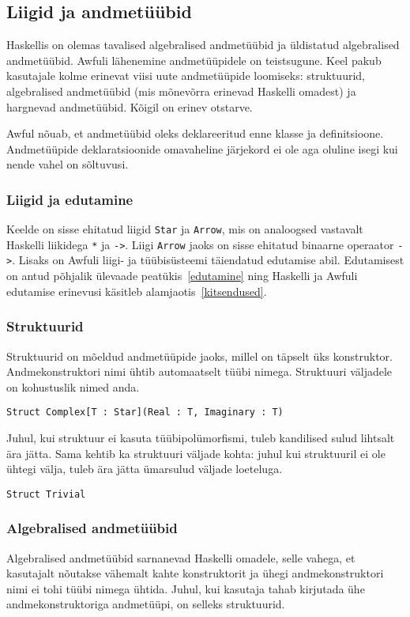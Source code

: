 \documentclass[12pt]{article}
\begin{document}
    \subsection{Liigid ja andmetüübid}
      Haskellis on olemas tavalised algebralised andmetüübid ja üldistatud algebralised andmetüübid. Awfuli lähenemine andmetüüpidele on teistsugune. Keel pakub kasutajale kolme erinevat viisi uute andmetüüpide loomiseks: struktuurid, algebralised andmetüübid (mis mõnevõrra erinevad Haskelli omadest) ja hargnevad andmetüübid. Kõigil on erinev otstarve.

      Awful nõuab, et andmetüübid oleks deklareeritud enne klasse ja definitsioone. Andmetüüpide deklaratsioonide omavaheline järjekord ei ole aga oluline isegi kui nende vahel on sõltuvusi.
      \subsubsection{Liigid ja edutamine}
        Keelde on sisse ehitatud liigid \verb!Star! ja \verb!Arrow!, mis on analoogsed vastavalt Haskelli liikidega \verb!*! ja \verb!->!. Liigi \verb!Arrow! jaoks on sisse ehitatud binaarne operaator \verb!->!. Lisaks on Awfuli liigi- ja tüübisüsteemi täiendatud edutamise abil. Edutamisest on antud põhjalik ülevaade peatükis~\ref{edutamine} ning Haskelli ja Awfuli edutamise erinevusi käsitleb alamjaotis~\ref{kitsendused}.
      \subsubsection{Struktuurid}
        Struktuurid on mõeldud andmetüüpide jaoks, millel on täpselt üks konstruktor. Andmekonstruktori nimi ühtib automaatselt tüübi nimega. Struktuuri väljadele on kohustuslik nimed anda.

        \begin{verbatim}Struct Complex[T : Star](Real : T, Imaginary : T)\end{verbatim}

        Juhul, kui struktuur ei kasuta tüübipolümorfismi, tuleb kandilised sulud lihtsalt ära jätta. Sama kehtib ka struktuuri väljade kohta: juhul kui struktuuril ei ole ühtegi välja, tuleb ära jätta ümarsulud väljade loeteluga.

        \begin{verbatim}Struct Trivial\end{verbatim}

      \subsubsection{Algebralised andmetüübid}
        Algebralised andmetüübid sarnanevad Haskelli omadele, selle vahega, et kasutajalt nõutakse vähemalt kahte konstruktorit ja ühegi andmekonstruktori nimi ei tohi tüübi nimega ühtida. Juhul, kui kasutaja tahab kirjutada ühe andmekonstruktoriga andmetüüpi, on selleks struktuurid.
\end{document}
